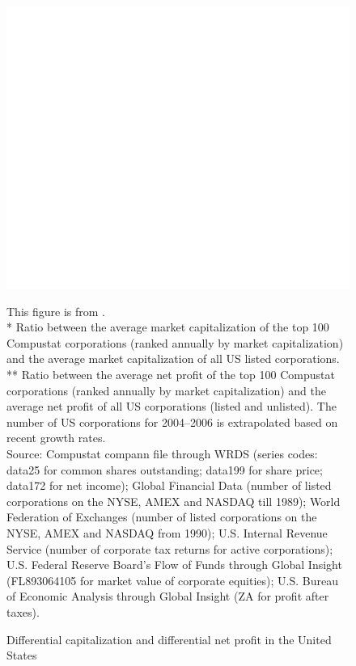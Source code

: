 \documentclass[12pt]{extarticle}
\begin{document}
\begin{figure}
	\centerline{\includegraphics[scale=0.15]{fig_142.png}}
	\caption{Differential capitalization and differential net profit in the United States}
	\label{fig_diff_capital}
	
	\small
	\smallskip
	
	This figure is from \cite{nitzan_capital_2009}. \\
	
	 * Ratio between the average market capitalization of the top 100 Compustat corporations (ranked annually by market capitalization) and the average market capitalization of all US listed corporations. \\
	
	** Ratio between the average net profit of the top 100 Compustat corporations (ranked annually by market capitalization) and the average net profit of all US corporations (listed and unlisted). The number of US corporations for 2004–2006 is extrapolated based on recent growth rates. \\
	
	Source: Compustat compann file through WRDS (series codes: data25 for common shares outstanding; data199 for share price; data172 for net income); Global Financial Data (number of listed corporations on the NYSE, AMEX and NASDAQ till 1989); World Federation of Exchanges (number of listed corporations on the NYSE, AMEX and NASDAQ from 1990); U.S. Internal Revenue Service (number of corporate tax returns for active corporations); U.S. Federal Reserve Board’s Flow of Funds through Global Insight (FL893064105 for market value of corporate equities); U.S. Bureau of Economic Analysis through Global Insight (ZA for profit after taxes).	
	
\end{figure}
\end{document}
